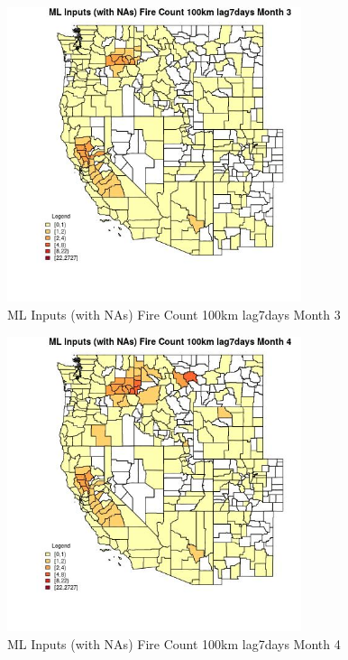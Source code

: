 \begin{figure} 
\centering  
\includegraphics[width=0.77\textwidth]{Code_Outputs/Report_ML_input_PM25_Step4_part_f_de_duplicated_aves_prioritize_24hr_obswNAs_CountyFire_Count_100km_lag7daysmedianMonth3.jpg} 
\caption{\label{fig:Report_ML_input_PM25_Step4_part_f_de_duplicated_aves_prioritize_24hr_obswNAsCountyFire_Count_100km_lag7daysmedianMonth3}ML Inputs (with NAs) Fire Count 100km lag7days Month 3} 
\end{figure} 
 

\begin{figure} 
\centering  
\includegraphics[width=0.77\textwidth]{Code_Outputs/Report_ML_input_PM25_Step4_part_f_de_duplicated_aves_prioritize_24hr_obswNAs_CountyFire_Count_100km_lag7daysmedianMonth4.jpg} 
\caption{\label{fig:Report_ML_input_PM25_Step4_part_f_de_duplicated_aves_prioritize_24hr_obswNAsCountyFire_Count_100km_lag7daysmedianMonth4}ML Inputs (with NAs) Fire Count 100km lag7days Month 4} 
\end{figure} 
 

